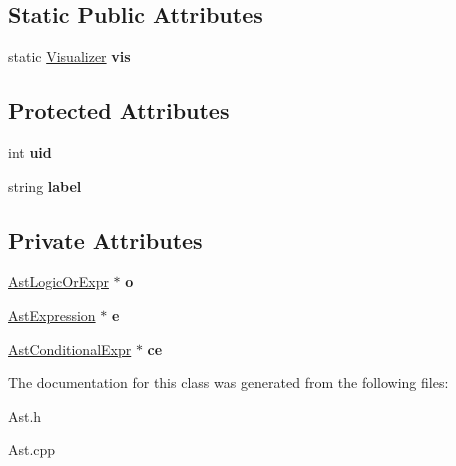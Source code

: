 \subsection*{Static Public Attributes}
\begin{DoxyCompactItemize}
\item 
\hypertarget{classAST_aca9e6637209b31e03a09c0d42f29bdfa}{static \hyperlink{classVisualizer}{Visualizer} {\bfseries vis}}\label{classAST_aca9e6637209b31e03a09c0d42f29bdfa}

\end{DoxyCompactItemize}
\subsection*{Protected Attributes}
\begin{DoxyCompactItemize}
\item 
\hypertarget{classAST_a847b778f1c3dd5a19de32de432ee6e15}{int {\bfseries uid}}\label{classAST_a847b778f1c3dd5a19de32de432ee6e15}

\item 
\hypertarget{classAST_ab2e239ccc0688d2341724432ff5a1a31}{string {\bfseries label}}\label{classAST_ab2e239ccc0688d2341724432ff5a1a31}

\end{DoxyCompactItemize}
\subsection*{Private Attributes}
\begin{DoxyCompactItemize}
\item 
\hypertarget{classAstConditionalExpr_afb5c95122ed18e359b4ab67d65c614b1}{\hyperlink{classAstLogicOrExpr}{Ast\-Logic\-Or\-Expr} $\ast$ {\bfseries o}}\label{classAstConditionalExpr_afb5c95122ed18e359b4ab67d65c614b1}

\item 
\hypertarget{classAstConditionalExpr_ac0dc3162f2834170fc10c6904a2d93d1}{\hyperlink{classAstExpression}{Ast\-Expression} $\ast$ {\bfseries e}}\label{classAstConditionalExpr_ac0dc3162f2834170fc10c6904a2d93d1}

\item 
\hypertarget{classAstConditionalExpr_a69c070ce68c209f09cc5876945c743e7}{\hyperlink{classAstConditionalExpr}{Ast\-Conditional\-Expr} $\ast$ {\bfseries ce}}\label{classAstConditionalExpr_a69c070ce68c209f09cc5876945c743e7}

\end{DoxyCompactItemize}


The documentation for this class was generated from the following files\-:\begin{DoxyCompactItemize}
\item 
Ast.\-h\item 
Ast.\-cpp\end{DoxyCompactItemize}
